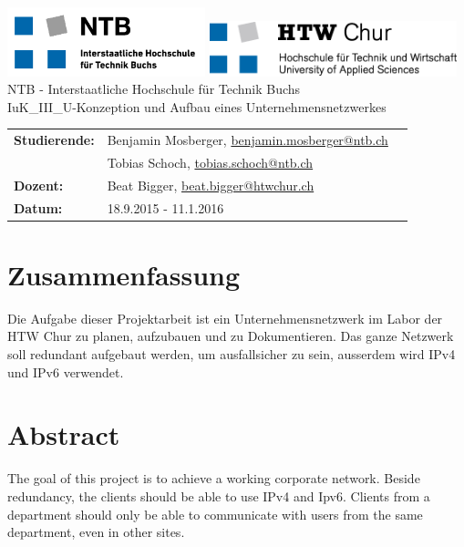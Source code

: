 \documentclass[11pt,a4paper]{scrreprt}
\begin{document}
\thispagestyle{empty}
\begin{center}
	\includegraphics[height=2cm]{logo_ntb.png}
	\hspace*{6cm}
	\includegraphics[height=1.6cm]{logo_htw.png}\\
	\vspace{5cm}
	\Large{NTB - Interstaatliche Hochschule für Technik Buchs}\\
	\vspace{3cm}
	\Huge{IuK\_III\_U-Konzeption und Aufbau eines Unternehmensnetzwerkes}\\
	\vspace{6cm}
	\Large{}
	\doublespacing
	\begin{tabular}{lll}
		\textbf{Studierende:} & Benjamin Mosberger, \href{mailto:benjamin.mosberger@ntb.ch} {benjamin.mosberger@ntb.ch}\\ 
		& Tobias Schoch, \href{mailto:tobias.schoch@ntb.ch} {tobias.schoch@ntb.ch}\\
		\textbf{Dozent:} & Beat Bigger, \href{mailto: beat.bigger@htwchur.ch}{beat.bigger@htwchur.ch} \\
		\textbf{Datum:} & 18.9.2015 - 11.1.2016
	\end{tabular}	
\end{center}
\restoregeometry
\pagebreak

\setcounter{page}{1}
\onehalfspacing 

\section*{Zusammenfassung}
Die Aufgabe dieser Projektarbeit ist ein Unternehmensnetzwerk im Labor der HTW Chur zu planen, aufzubauen und zu Dokumentieren. Das ganze Netzwerk soll redundant aufgebaut werden, um ausfallsicher zu sein, ausserdem wird IPv4 und IPv6 verwendet.


\vspace{4cm}

\section*{Abstract}
The goal of this project is to achieve a working corporate network. Beside redundancy, the clients should be able to use IPv4 and Ipv6. Clients from a department should only be able to communicate with users from the same department, even in other sites.
\end{document}
